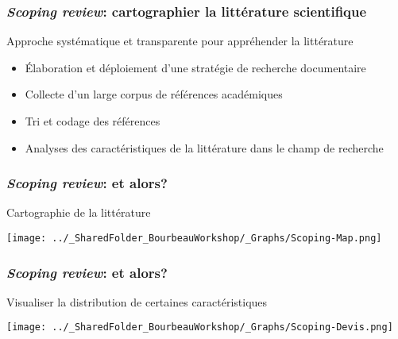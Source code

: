 \documentclass{beamer}
\begin{document}
    \begin{frame}
    
      \frametitle{\emph{Scoping review}: cartographier la littérature scientifique} \vspace{1cm}
      
    Approche systématique et transparente pour appréhender la littérature
    
        \begin{itemize}
          \item{Élaboration et déploiement d'une stratégie de recherche documentaire}
          \item{Collecte d'un large corpus de références académiques}
          \item{Tri et codage des références}
          \item{Analyses des caractéristiques de la littérature dans le champ de recherche}
        \end{itemize}
          
    \end{frame}  
    

    \begin{frame}
    
      \frametitle{\emph{Scoping review}: et \R alors?} \vspace{1cm}
      
      Cartographie de la littérature
      
        \begin{center}
         \texttt{[image: ../\_SharedFolder\_BourbeauWorkshop/\_Graphs/Scoping-Map.png]}
        \end{center} 
      
          
    \end{frame}  
    

    \begin{frame}
    
      \frametitle{\emph{Scoping review}: et \R alors?} \vspace{1cm}
      
      Visualiser la distribution de certaines caractéristiques
      
        \begin{center}
         \texttt{[image: ../\_SharedFolder\_BourbeauWorkshop/\_Graphs/Scoping-Devis.png]}
        \end{center} 
      
          
    \end{frame}  
    
\end{document}
